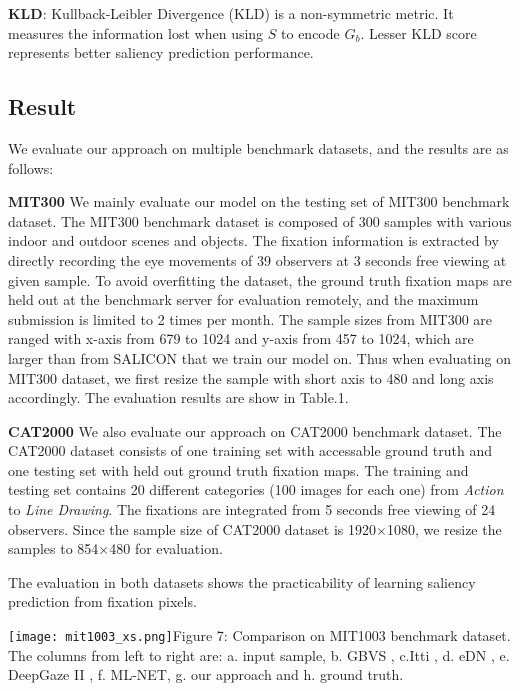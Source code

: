 \documentclass[letterpaper, 10 pt, conference]{ieeeconf}  %
\begin{document}
\par \textbf{KLD}: Kullback-Leibler Divergence (KLD) is a non-symmetric metric. It measures the information lost when using $S$ to encode $G_{b}$. Lesser KLD score represents better saliency prediction performance.

\subsection{Result}

\par We evaluate our approach on multiple benchmark datasets, and the results are as follows:


\par \textbf{MIT300} We mainly evaluate our model on the testing set of MIT300 \cite{b36} benchmark dataset. The MIT300 benchmark dataset is composed of 300 samples with various indoor and outdoor scenes and objects. The fixation information is extracted by directly recording the eye movements of 39 observers at 3 seconds free viewing at given sample. To avoid overfitting the dataset, the ground truth fixation maps are held out at the benchmark server for evaluation remotely, and the maximum submission is limited to 2 times per month. The sample sizes from MIT300 are ranged with x-axis from 679 to 1024 and y-axis from 457 to 1024, which are larger than from SALICON that we train our model on. Thus when evaluating on MIT300 dataset, we first resize the sample with short axis to 480 and long axis accordingly. The evaluation results are show in Table.1.

\par \textbf{CAT2000} We also evaluate our approach on CAT2000 \cite{b24} benchmark dataset. The CAT2000 dataset consists of one training set with accessable ground truth and one testing set with held out ground truth fixation maps. The training and testing set contains 20 different categories (100 images for each one) from \emph{Action} to \emph{Line Drawing}. The fixations are integrated from 5 seconds free viewing of 24 observers. Since the sample size of CAT2000 dataset is 1920$\times$1080, we resize the samples to 854$\times$480 for evaluation.

\par The evaluation in both datasets shows the practicability of learning saliency prediction from fixation pixels.

\begin{figure*}
\centering
    \texttt{[image: mit1003\_xs.png]}{Figure 7: Comparison on MIT1003 benchmark dataset. The columns from left to right are: a. input sample, b. GBVS \cite{b39}, c.Itti \cite{b44}, d. eDN \cite{b15}, e. DeepGaze II \cite{b18}, f. ML-NET\cite{b45}, g. our approach and h. ground truth.
    \label{fig7}}
\end{figure*}
\end{document}
